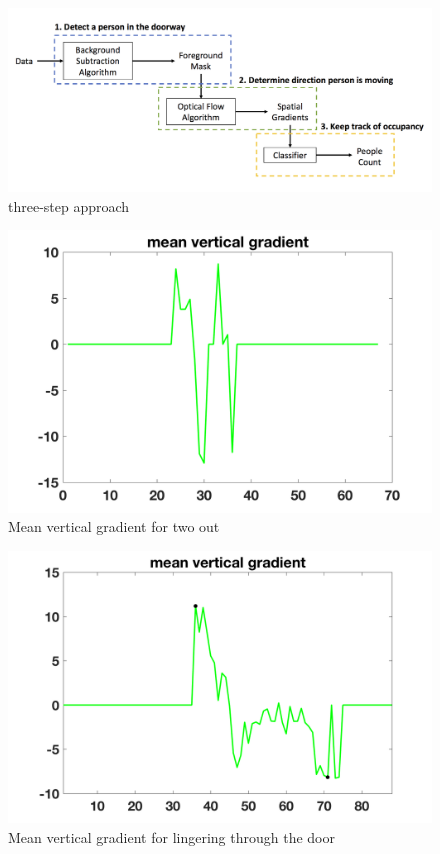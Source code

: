 \documentclass[12pt,oneside]{article} %
\begin{document}
\begin{figure}[htb]
\centering
\includegraphics[scale=0.2]{images/threestep.png}
\caption{three-step approach}
\label{threestep}
\end{figure}

\begin{figure}[htb]
\centering
\includegraphics[scale=0.52]{images/two_out.png}
\caption{Mean vertical gradient for two out}
\label{twoout}
\end{figure}

\begin{figure}[htb]
\centering
\includegraphics[scale=0.52]{images/lingerThrough.png}
\caption{Mean vertical gradient for lingering through the door}
\label{linger}
\end{figure}
\end{document}
